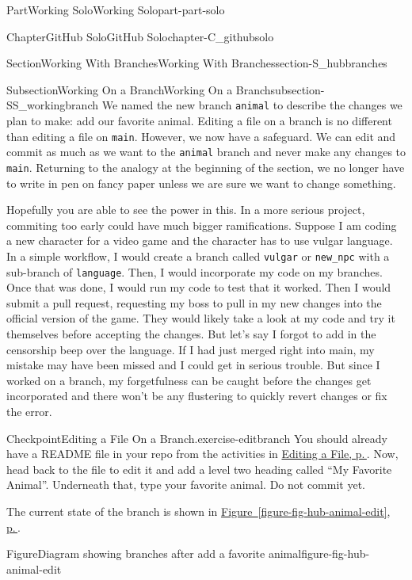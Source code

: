 \documentclass[twoside,10pt,]{book}
\newcommand{\xreffont}{\relax}
\newcommand{\mono}[1]{\texttt{#1}}
\begin{document}
\begin{partptx}{Part}{Working Solo}{}{Working Solo}{}{}{part-part-solo}
\begin{chapterptx}{Chapter}{GitHub Solo}{}{GitHub Solo}{}{}{chapter-C_githubsolo}
\begin{sectionptx}{Section}{Working With Branches}{}{Working With Branches}{}{}{section-S_hubbranches}
\typeout{************************************************}
%
\begin{subsectionptx}{Subsection}{Working On a Branch}{}{Working On a Branch}{}{}{subsection-SS_workingbranch}
%
We named the new branch \mono{animal} to describe the changes we plan to make: add our favorite animal. Editing a file on a branch is no different than editing a file on \mono{main}. However, we now have a safeguard. We can edit and commit as much as we want to the \mono{animal} branch and never make any changes to \mono{main}. Returning to the analogy at the beginning of the section, we no longer have to write in pen on fancy paper unless we are sure we want to change something.%
\par
Hopefully you are able to see the power in this. In a more serious project, commiting too early could have much bigger ramifications. Suppose I am coding a new character for a video game and the character has to use vulgar language. In a simple workflow, I would create a branch called \mono{vulgar} or \mono{new\_npc} with a sub-branch of \mono{language}. Then, I would incorporate my code on my branches. Once that was done, I would run my code to test that it worked. Then I would submit a pull request, requesting my boss to pull in my new changes into the official version of the game. They would likely take a look at my code and try it themselves before accepting the changes. But let's say I forgot to add in the censorship beep over the language. If I had just merged right into main, my mistake may have been missed and I could get in serious trouble. But since I worked on a branch, my forgetfulness can be caught before the changes get incorporated and there won't be any flustering to quickly revert changes or fix the error.%
\begin{inlineexercise}{Checkpoint}{Editing a File On a Branch.}{exercise-editbranch}%
You should already have a README file in your repo from the activities in \hyperref[subsection-hub-editfile]{Editing a File, p.\,\pageref{subsection-hub-editfile}}. Now, head back to the file to edit it and add a level two heading called ``My Favorite Animal''. Underneath that, type your favorite animal. Do not commit yet.%
\par
The current state of the branch is shown in \hyperref[figure-fig-hub-animal-edit]{Figure~{\xreffont\ref{figure-fig-hub-animal-edit}}, p.\,\pageref{figure-fig-hub-animal-edit}}.%
\end{inlineexercise}%
\begin{figureptx}{Figure}{Diagram showing branches after add a favorite animal}{figure-fig-hub-animal-edit}{}%

\end{figureptx}
\end{subsectionptx}
\end{sectionptx}
\end{chapterptx}
\end{partptx}
\end{document}
